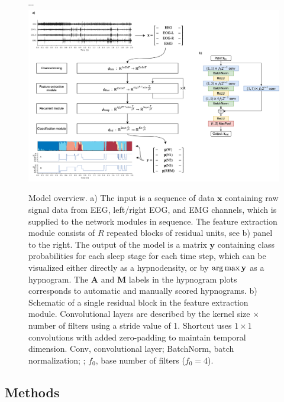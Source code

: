 \begin{figure}[tb]
\begin{adjustwidth*}{}{-\marginparwidth-\marginparsep}
    \includegraphics[width=\linewidth]{figures/paper-ii/figure_network.png}
    \caption[\acs{MASSC}v2 model overview]{Model overview. a) The input is a sequence of data \(\mathbf{x}\) containing raw signal data from \ac{EEG}, left/right \ac{EOG}, and \ac{EMG} channels, which is supplied to the network modules in sequence. The feature extraction module consists of \(R\) repeated blocks of residual units, see b) panel to the right. The output of the model is a matrix \(\mathbf{y}\) containing class probabilities for each sleep stage for each time step, which can be visualized either directly as a hypnodensity, or by \(\operatorname*{arg\,max}{\mathbf{y}}\) as a hypnogram. The \textbf{A} and \textbf{M} labels in the hypnogram plots corresponds to automatic and manually scored hypnograms. b) Schematic of a single residual block in the feature extraction module. Convolutional layers are described by the kernel size \(\times\) number of filters using a stride value of 1. Shortcut uses \(1\times1\) convolutions with added zero-padding to maintain temporal dimension. Conv, convolutional layer; BatchNorm, batch normalization; ; \(f_0\), base number of filters (\(f_0=4\)).}
    \label{fig:sleep-stages:paper-ii:figure-01}
\end{adjustwidth*}
\end{figure}

\subsection{Methods}

